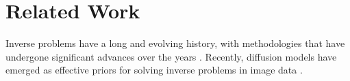 \section{Related Work}
\label{sec:related}

Inverse problems have a long and evolving history, with methodologies that have undergone significant advances over the years \cite{Daras2024survey}.
Recently, diffusion models \cite{sohl2015deep, ho2020denoising,songscore} have emerged as effective priors for solving inverse problems in image data \cite{wangzero,kawar2022denoising,chungdiffusion,dou2024diffusion,rout2024solving,song2023pseudoinverse,sun2024provable,Choi2021ILVRCM,chung2023parallel}. 



